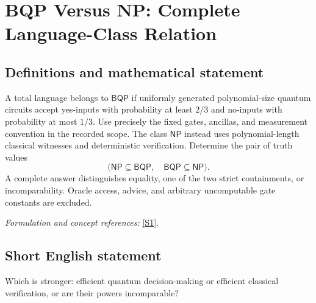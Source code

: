 \documentclass[11pt,a4paper]{article}
\newcommand{\sref}[2]{\hyperlink{source:#1:#2}{[S#2]}}
\newif\ifshowcatalogue
\newcommand{\cataloguescope}[1]{\ifshowcatalogue
 \paragraph{Exact scope in the supplied catalogue.}
 \begin{quote}\small #1\end{quote}\fi}
\begin{document}
\setcounter{section}{0}
\clearpage
\section*{\texorpdfstring{BQP Versus NP: Complete Language-Class Relation}{BQP Versus NP: Complete Language-Class Relation}}\label{30006681}
\subsection{Definitions and mathematical statement}
A total language belongs to $\mathsf{BQP}$ if uniformly generated polynomial-size quantum circuits accept yes-inputs with probability at least $2/3$ and no-inputs with probability at most $1/3$. Use precisely the fixed gates, ancillas, and measurement convention in the recorded scope. The class $\mathsf{NP}$ instead uses polynomial-length classical witnesses and deterministic verification. Determine the pair of truth values
\[
 \bigl(\mathsf{NP}\subseteq\mathsf{BQP},\quad
       \mathsf{BQP}\subseteq\mathsf{NP}\bigr).
\]
A complete answer distinguishes equality, one of the two strict containments, or incomparability. Oracle access, advice, and arbitrary uncomputable gate constants are excluded.
\par\smallskip\textit{Formulation and concept references:} \sref{30006681}{1}.
\cataloguescope{Determine the truth values of BOTH NP subseteq BQP and BQP subseteq NP for unrelativized, advice-free classes of total languages over \{0,1\}. NP consists of languages with polynomial-length binary witnesses and a deterministic polynomial-time verifier. BQP consists of languages decided by polynomial-time uniformly generated polynomial-size quantum circuits (a deterministic Turing machine outputs Q\_n on 1\textasciicircum{}n), using Watrous's fixed Toffoli, Hadamard and phase-i gates with |0> ancillas and discarding, followed by a standard-basis output measurement. On every yes input acceptance is at least 2/3, and on every no input it is at most 1/3. No arbitrary real gate constants, advice or oracle are available. Establish equality, either proper containment, or incomparability.}
\subsection{Short English statement}
Which is stronger: efficient quantum decision-making or efficient classical verification, or are their powers incomparable?
\end{document}
